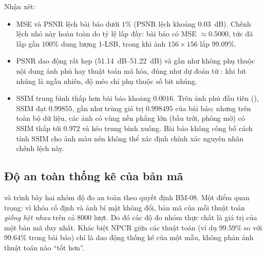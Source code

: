 Nhận xét:
\begin{itemize}
  \item MSE và PSNR lệch bài báo dưới $1\%$ (PSNR lệch khoảng \SI{0.03}{dB}). Chênh lệch nhỏ này
        hoàn toàn do tỷ lệ lấp đầy: bài báo có MSE $\approx 0.5000$, tức đã lấp gần $100\%$ dung
        lượng 1-LSB, trong khi ảnh $156\times156$ lấp $99.09\%$.
  \item PSNR dao động rất hẹp (\SIrange{51.14}{51.22}{dB}) và gần như không phụ thuộc nội dung ảnh
        phủ hay thuật toán mã hóa, đúng như dự đoán từ : khi bit nhúng là ngẫu
        nhiên, độ méo chỉ phụ thuộc số bit nhúng.
  \item SSIM trung bình thấp hơn bài báo khoảng $0.0016$. Trên ảnh phủ đầu tiên (),
        SSIM đạt $0.99855$, gần như trùng giá trị $0.998495$ của bài báo; nhưng trên toàn bộ dữ liệu,
        các ảnh có vùng nền phẳng lớn (bầu trời, phông mờ) có SSIM thấp tới $0.972$ và kéo trung bình
        xuống. Bài báo không công bố cách tính SSIM cho ảnh màu nên không thể xác định chính xác
        nguyên nhân chênh lệch này.
\end{itemize}

\subsection{Độ an toàn thống kê của bản mã}
\label{sec:ketqua-antoan}

 và  trình bày hai nhóm độ đo an toàn theo quyết định BM-08.
Một điểm quan trọng: vì khóa cố định và ảnh bí mật không đổi, bản mã của mỗi thuật toán \emph{giống
hệt nhau} trên cả 8000 lượt. Do đó các độ đo nhóm  thực chất là giá trị của một bản mã
duy nhất. Khác biệt NPCR giữa các thuật toán (ví dụ $99.59\%$ so với $99.64\%$ trong bài báo) chỉ là
dao động thống kê của một mẫu, không phản ánh thuật toán nào ``tốt hơn''.


